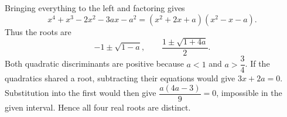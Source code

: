 Bringing everything to the left and factoring gives
\[
x^4+x^3-2x^2-3ax-a^2=(x^2+2x+a)(x^2-x-a).
\]
Thus the roots are
\[
\boxed{-1\pm\sqrt{1-a},\qquad \dfrac{1\pm\sqrt{1+4a}}{2}}.
\]
Both quadratic discriminants are positive because $a<1$ and $a>\dfrac{3}{4}$. If the quadratics shared a root, subtracting their equations would give $3x+2a=0$. Substitution into the first would then give $\dfrac{a(4a-3)}{9}=0$, impossible in the given interval. Hence all four real roots are distinct.
